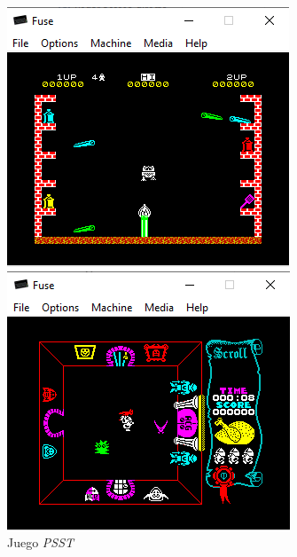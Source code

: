 \documentclass{article}
\begin{document}
\begin{figure}[!htb]
   \begin{minipage}{0.32\textwidth}
     \centering
     \includegraphics[width=\linewidth]{images/pst.png}
     \caption{Juego \textit{PSST}}\label{Fig:pst}
   \end{minipage}\hfill
   \begin{minipage}{0.32\textwidth}
     \centering
     \includegraphics[width=\linewidth]{images/atic-atac.png}

\end{minipage}
\end{figure}
\end{document}
